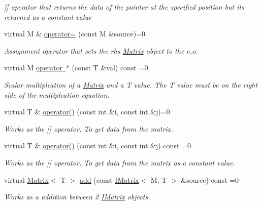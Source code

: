 \begin{DoxyCompactItemize}
\begin{DoxyCompactList}\small\item\em \mbox{[}\mbox{]} operator that returns the data of the pointer at the specified position but its returned as a constant value \end{DoxyCompactList}\item 
virtual M \& \mbox{\hyperlink{class_i_matrix_a9eeb68de7e1d37d1aab439c78fea9be3}{operator=}} (const M \&source)=0
\begin{DoxyCompactList}\small\item\em Assignment operator that sets the rhs \mbox{\hyperlink{class_matrix}{Matrix}} object to the c.\+o. \end{DoxyCompactList}\item 
virtual M \mbox{\hyperlink{class_i_matrix_a10121e038635bdf33552c6a1fb288398}{operator $\ast$}} (const T \&val) const =0
\begin{DoxyCompactList}\small\item\em Scalar multiplcation of a \mbox{\hyperlink{class_matrix}{Matrix}} and a T value. The T value must be on the right side of the multiplcation equation. \end{DoxyCompactList}\item 
virtual T \& \mbox{\hyperlink{class_i_matrix_a1e4246d163aaca1b224dec8839645ea9}{operator()}} (const int \&i, const int \&j)=0
\begin{DoxyCompactList}\small\item\em Works as the \mbox{[}\mbox{]} operator. To get data from the matrix. \end{DoxyCompactList}\item 
virtual T \& \mbox{\hyperlink{class_i_matrix_a2abf1a0d2454051da3ccf9cacf12797e}{operator()}} (const int \&i, const int \&j) const =0
\begin{DoxyCompactList}\small\item\em Works as the \mbox{[}\mbox{]} operator. To get data from the matrix as a constant value. \end{DoxyCompactList}\item 
virtual \mbox{\hyperlink{class_matrix}{Matrix}}$<$ T $>$ \mbox{\hyperlink{class_i_matrix_a661dc43bb607b98c28414cdd49bc64f7}{add}} (const \mbox{\hyperlink{class_i_matrix}{I\+Matrix}}$<$ M, T $>$ \&source) const =0
\begin{DoxyCompactList}\small\item\em Works as a addition between 2 \mbox{\hyperlink{class_i_matrix}{I\+Matrix}} objects. \end{DoxyCompactList}\item 

\end{DoxyCompactItemize}
